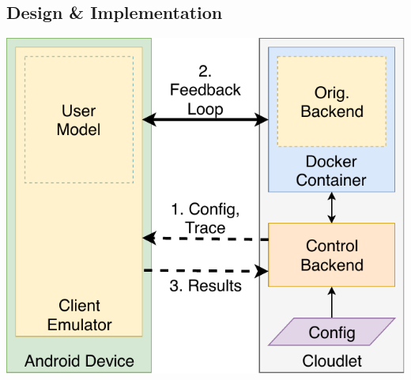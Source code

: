 \documentclass[portrait, a1]{KTHEEposter}
\begin{document}
\begin{pcolumns}[3]
\begin{pcolumn}[2]
\begin{pframe}[1.1]
                \section{Design \& Implementation}
                \begin{center}
                    \medskip
                    \includegraphics[width=\linewidth]{img/TraceReplay_GenArch}
                    \medskip
                \end{center}


\end{pframe}
\end{pcolumn}
\end{pcolumns}
\end{document}
